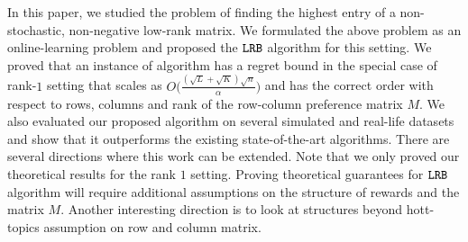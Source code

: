 In this paper, we studied the problem of finding the highest entry of a non-stochastic, non-negative low-rank matrix. We formulated the above problem as an online-learning problem and proposed the ${\tt LRB}$ algorithm for this setting. We proved that an instance of algorithm has a regret bound in the special case of rank-$1$ setting that scales as $O\big(\frac{(\sqrt{L } + \sqrt{K }) \sqrt{n}}{\alpha}\big)$ and has the correct order with respect to rows, columns and rank of the row-column preference matrix $M$. We also evaluated our proposed algorithm on several simulated and real-life datasets and show that it outperforms the existing state-of-the-art algorithms. There are several directions where this work can be extended. Note that we only proved our theoretical results for the rank $1$ setting. Proving theoretical guarantees for ${\tt LRB}$ algorithm will require additional assumptions on the structure of rewards and the matrix $M$. Another interesting direction is to look at structures beyond hott-topics assumption on row and column matrix.

